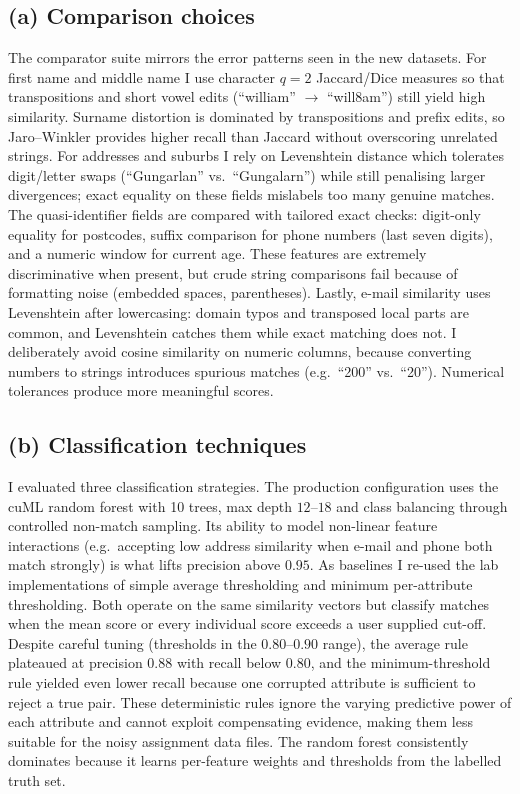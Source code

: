 \documentclass[11pt]{article}
\begin{document}
\subsection*{(a) Comparison choices}
The comparator suite mirrors the error patterns seen in the new datasets. For first name and middle name I use character $q{=}2$ Jaccard/Dice measures so that transpositions and short vowel edits (``william'' $\rightarrow$ ``will8am'') still yield high similarity. Surname distortion is dominated by transpositions and prefix edits, so Jaro--Winkler provides higher recall than Jaccard without overscoring unrelated strings. For addresses and suburbs I rely on Levenshtein distance which tolerates digit/letter swaps (``Gungarlan'' vs.\ ``Gungalarn'') while still penalising larger divergences; exact equality on these fields mislabels too many genuine matches. The quasi-identifier fields are compared with tailored exact checks: digit-only equality for postcodes, suffix comparison for phone numbers (last seven digits), and a numeric window for current age. These features are extremely discriminative when present, but crude string comparisons fail because of formatting noise (embedded spaces, parentheses). Lastly, e-mail similarity uses Levenshtein after lowercasing: domain typos and transposed local parts are common, and Levenshtein catches them while exact matching does not. I deliberately avoid cosine similarity on numeric columns, because converting numbers to strings introduces spurious matches (e.g.\ ``200'' vs.\ ``20''). Numerical tolerances produce more meaningful scores.

\subsection*{(b) Classification techniques}
I evaluated three classification strategies. The production configuration uses the cuML random forest with 10 trees, max depth $12$--$18$ and class balancing through controlled non-match sampling. Its ability to model non-linear feature interactions (e.g.\ accepting low address similarity when e-mail and phone both match strongly) is what lifts precision above $0.95$. As baselines I re-used the lab implementations of simple average thresholding and minimum per-attribute thresholding. Both operate on the same similarity vectors but classify matches when the mean score or every individual score exceeds a user supplied cut-off. Despite careful tuning (thresholds in the $0.80$--$0.90$ range), the average rule plateaued at precision $0.88$ with recall below $0.80$, and the minimum-threshold rule yielded even lower recall because one corrupted attribute is sufficient to reject a true pair. These deterministic rules ignore the varying predictive power of each attribute and cannot exploit compensating evidence, making them less suitable for the noisy assignment data files. The random forest consistently dominates because it learns per-feature weights and thresholds from the labelled truth set.
\end{document}
